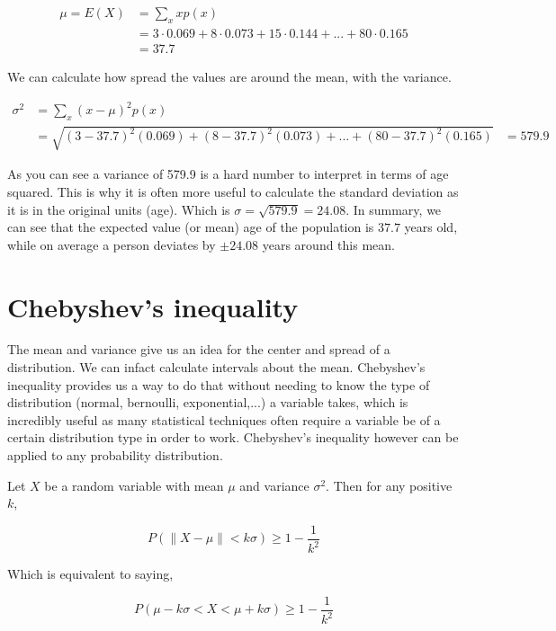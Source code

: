 \begin{align*}
	\mu = E(X) & = \sum_{x}xp(x) \\
	& = 3\cdot 0.069 + 8\cdot 0.073 + 15\cdot 0.144 + ... + 80\cdot 0.165 \\
	& = 37.7
\end{align*}

We can calculate how spread the values are around the mean, with the variance.

\begin{align*}
	\sigma ^2 & = \sum_{x}(x-\mu)^{2}p(x) \\
	& = \sqrt{(3-37.7)^2(0.069) + (8-37.7)^2(0.073) + ... + (80-37.7)^2(0.165)}
	& = 579.9
\end{align*}

As you can see a variance of 579.9 is a hard number to interpret in terms of age squared. This is why it is often more useful
to calculate the standard deviation as it is in the original units (age). Which is $\sigma = \sqrt{579.9} = 24.08$. In summary, we can
see that the expected value (or mean) age of the population is $37.7$ years old, while on average a person deviates by $\pm 24.08$ years around this mean.

\section{Chebyshev's inequality}
The mean and variance give us an idea for the center and spread of a distribution. We can infact calculate intervals about the mean. Chebyshev's inequality
provides us a way to do that without needing to know the type of distribution (normal, bernoulli, exponential,...) a variable takes, which is incredibly useful
as many statistical techniques often require a variable be of a certain distribution type in order to work. Chebyshev's inequality however can be applied to
any probability distribution.\newline

Let $X$ be a random variable with mean $\mu$ and variance $\sigma ^2$. Then for any positive $k$,

\begin{equation*}
	P(\left \| X - \mu\right \| < k\sigma) \geq 1 - \frac{1}{k^2}
\end{equation*}

Which is equivalent to saying,

\begin{equation*}
	P(\mu - k\sigma < X < \mu + k\sigma) \geq 1 - \frac{1}{k^2}
\end{equation*}


